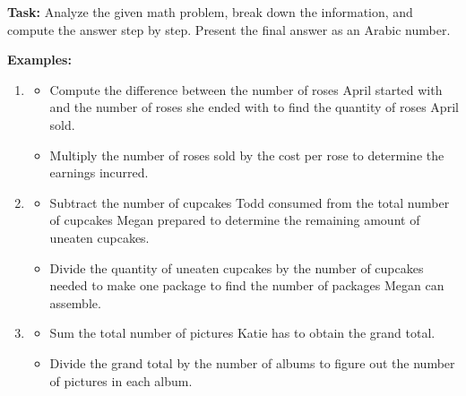 \begin{tcolorbox}[breakable,colframe=mybluecolor!100, colback=mybluecolor!20, title=بهترین اعلان دستوری تولید شده برای مجموعه داده MultiArith] \label{p_MutiArith}
	\begin{LTR}
	\textbf{Task:} Analyze the given math problem, break down the information, and compute the answer step by step. Present the final answer as an Arabic number.
	
	\textbf{Examples:}
	\begin{enumerate}
		\item {}
		\begin{itemize}
			\item Compute the difference between the number of roses April started with and the number of roses she ended with to find the quantity of roses April sold.
			\item Multiply the number of roses sold by the cost per rose to determine the earnings incurred.
		\end{itemize}
		
		\item {}
		\begin{itemize}
			\item Subtract the number of cupcakes Todd consumed from the total number of cupcakes Megan prepared to determine the remaining amount of uneaten cupcakes.
			\item Divide the quantity of uneaten cupcakes by the number of cupcakes needed to make one package to find the number of packages Megan can assemble.
		\end{itemize}
		
		\item {}
		\begin{itemize}
			\item Sum the total number of pictures Katie has to obtain the grand total.
			\item Divide the grand total by the number of albums to figure out the number of pictures in each album.
		\end{itemize}
		

\end{enumerate}
\end{LTR}
\end{tcolorbox}
